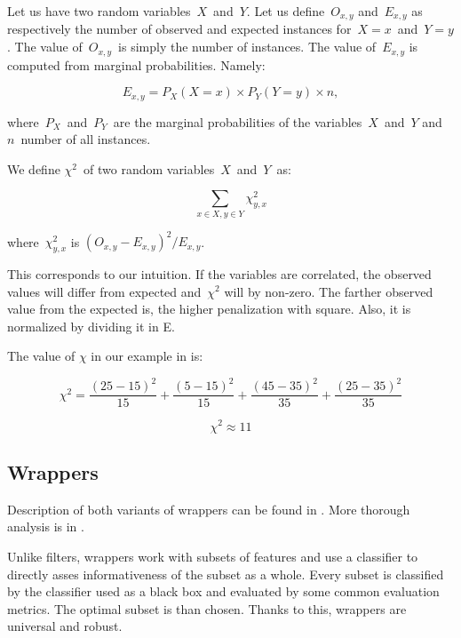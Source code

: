 Let us have two random variables~$X$~and~$Y$.
Let us define~$O_{x,y}$ and~$E_{x,y}$
as respectively the number of observed and expected instances for~$X=x$~and~$Y=y$.
The value of~$O_{x,y}$~is simply the number of instances.
The value of~$E_{x,y}$ is computed from marginal probabilities.
Namely:

\begin{equation}
E_{x,y} = P_X(X=x) \times P_Y(Y=y) \times n,
\end{equation}

where~$P_X$~and~$P_Y$~are the marginal probabilities of the variables~$X$~and~$Y$
and~$n$~number of all instances.

We define $\chi^2$~of two random variables~$X$~and~$Y$~as:

\begin{equation}
\sum_{x \in X, y \in Y}{\chi^2_{y,x}}
\end{equation}

\noindent
where~${\chi^2_{y,x}}$ is $\left(O_{x,y} - E_{x,y} \right)^ 2 / E_{x,y}$.

This corresponds to our intuition.
If the variables are correlated,
the observed values will differ from expected and~$\chi^2$ will by non-zero.
The farther observed value from the expected is, the higher penalization with square.
Also, it is normalized by dividing it in E.

The value of $\chi$ in our example in  is:

\begin{equation}
\chi^2 = 
\frac{\left(25-15\right)^2}{15} +
\frac{\left(5-15\right)^2}{15} +
\frac{\left(45-35\right)^2}{35} +
\frac{\left(25-35\right)^2}{35}
\end{equation}

\begin{equation}
\chi^2 \approx 11
\end{equation}


\subsection{Wrappers}

Description of both variants of wrappers can be found in \citet{GuyEli03}.
More thorough analysis is in \citet{kohavi1997wrappers}.

Unlike filters, wrappers work with subsets of features
and use a classifier to directly asses informativeness of the subset as a whole.
Every subset is classified by the classifier used as a black box
and evaluated by some common evaluation metrics.
The optimal subset is than chosen.
Thanks to this, wrappers are universal and robust.

